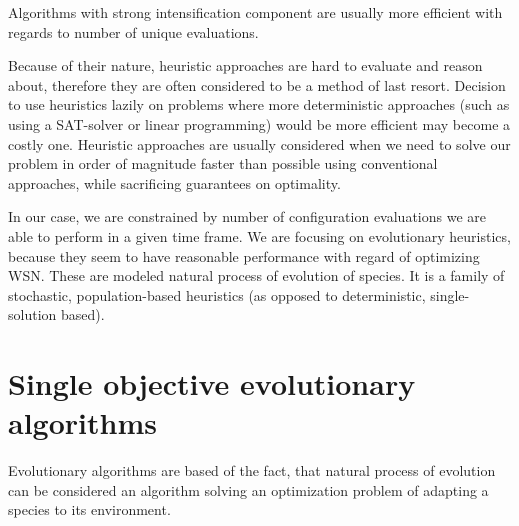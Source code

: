 \documentclass[12pt,oneside]{fithesis2}
\begin{document}
Algorithms with strong intensification component are usually more efficient with regards to number of unique evaluations.


Because of their nature, heuristic approaches are hard to evaluate and reason about, therefore they are often considered to be a method of last resort. Decision to use heuristics lazily on problems where more deterministic approaches (such as using a SAT-solver or linear programming) would be more efficient may become a costly one. Heuristic approaches are usually considered when we need to solve our problem in order of magnitude faster than possible using conventional approaches, while sacrificing guarantees on optimality.

In our case, we are constrained by number of configuration evaluations we are able to perform in a given time frame. 
We are focusing on evolutionary heuristics, because they seem to have reasonable performance with regard of optimizing WSN.\cite{stehl2013opt}
These are modeled natural process of evolution of species. It is a family of stochastic, population-based heuristics (as opposed to deterministic, single-solution based). 

\section{Single objective evolutionary algorithms}

Evolutionary algorithms are based of the fact, that natural process of evolution can be considered an algorithm solving an optimization problem of adapting a species to its environment. 
\end{document}
